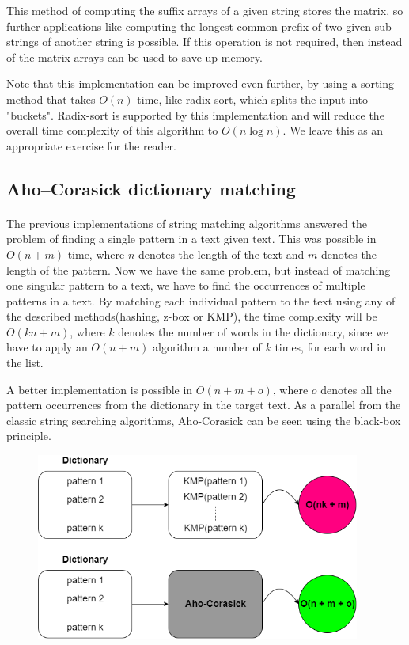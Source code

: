\documentclass[letterpaper]{article}
\begin{document}
This method of computing the suffix arrays of a given string stores the matrix, so further applications like computing the longest common prefix of two given sub-strings of another string is possible. If this operation is not required, then instead of the matrix arrays can be used to save up memory.

Note that this implementation can be improved even further, by using a sorting method that takes $O(n)$ time, like radix-sort, which splits the input into "buckets". Radix-sort is supported by this implementation and will reduce the overall time complexity of this algorithm to $O(n \log n)$. We leave this as an appropriate exercise for the reader.

\newpage

\subsection{Aho–Corasick dictionary matching}

\paragraph{}

The previous implementations of string matching algorithms answered the problem of finding a single pattern in a text given text. This was possible in $O(n + m)$ time, where $n$ denotes the length of the text and $m$ denotes the length of the pattern. Now we have the same problem, but instead of matching one singular pattern to a text, we have to find the occurrences of multiple patterns in a text. By matching each individual pattern to the text using any of the described methods(hashing, z-box or KMP), the time complexity will be $O(kn + m)$, where $k$ denotes the number of words in the dictionary, since we have to apply an $O(n + m)$ algorithm a number of $k$ times, for each word in the list.

A better implementation is possible in $O(n + m + o)$, where $o$ denotes all the pattern occurrences from the dictionary in the target text. As a parallel from the classic string searching algorithms, Aho-Corasick can be seen using the black-box principle.

\begin{figure} [h!]
\centering
\includegraphics[width=0.95\textwidth]{pngOfDiagrams/aho1.png}
\end{figure}
\end{document}
